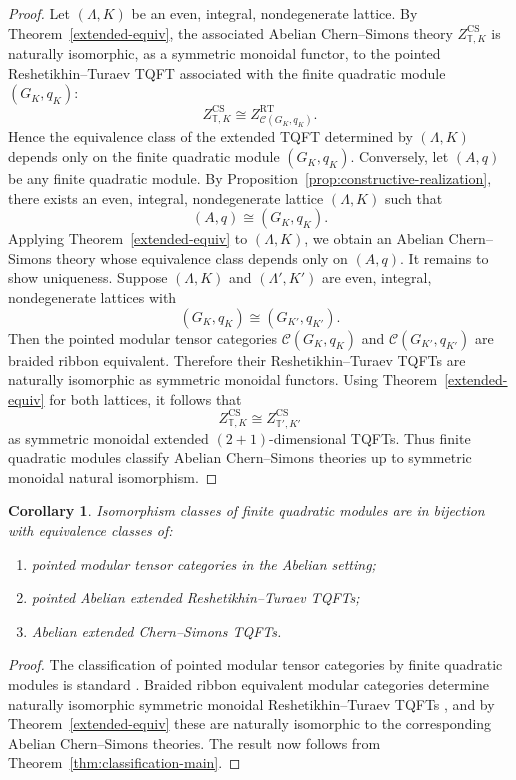 \documentclass[12pt]{amsart}
\numberwithin{equation}{section}
\newtheorem{corollary}[theorem]{Corollary}
\begin{document}
\begin{proof}
Let $(\Lambda,K)$ be an even, integral, nondegenerate lattice. By Theorem~\ref{extended-equiv}, the associated Abelian Chern--Simons theory $Z^{\mathrm{CS}}_{\mathbb T,K}$
is naturally isomorphic, as a symmetric monoidal functor, to the pointed Reshetikhin--Turaev TQFT associated with the finite quadratic module $(G_K,q_K)$:
\[
Z^{\mathrm{CS}}_{\mathbb T,K}
\cong
Z^{\mathrm{RT}}_{\mathcal C(G_K,q_K)}.
\]
Hence the equivalence class of the extended TQFT determined by $(\Lambda,K)$ depends only on the finite quadratic module $(G_K,q_K)$. Conversely, let $(A,q)$ be any finite quadratic module. By Proposition~\ref{prop:constructive-realization}, there exists an even, integral, nondegenerate lattice $(\Lambda,K)$ such that
\[
(A,q)\cong (G_K,q_K).
\]
Applying Theorem~\ref{extended-equiv} to $(\Lambda,K)$, we obtain an Abelian Chern--Simons theory whose equivalence class depends only on $(A,q)$. It remains to show uniqueness. Suppose $(\Lambda,K)$ and $(\Lambda',K')$ are even, integral, nondegenerate lattices with
\[
(G_K,q_K)\cong (G_{K'},q_{K'}).
\]
Then the pointed modular tensor categories $\mathcal C(G_K,q_K)$ and $\mathcal C(G_{K'},q_{K'})$ are braided ribbon equivalent. Therefore their Reshetikhin--Turaev TQFTs are naturally isomorphic as symmetric monoidal functors. Using Theorem~\ref{extended-equiv} for both lattices, it follows that
\[
Z^{\mathrm{CS}}_{\mathbb T,K}
\cong
Z^{\mathrm{CS}}_{\mathbb T',K'}
\]
as symmetric monoidal extended $(2+1)$-dimensional TQFTs. Thus finite quadratic modules classify Abelian Chern--Simons theories up to symmetric monoidal natural isomorphism.
\end{proof}

\begin{corollary}
\label{cor:equivalent-classifications}
Isomorphism classes of finite quadratic modules are in bijection with equivalence classes of:
\begin{enumerate}
\item[\textup{(i)}] pointed modular tensor categories in the  Abelian setting;
\item[\textup{(ii)}] pointed Abelian extended  Reshetikhin--Turaev TQFTs;
\item[\textup{(iii)}] Abelian extended Chern--Simons TQFTs.
\end{enumerate}
\end{corollary}

\begin{proof}
The classification of pointed modular tensor categories by finite quadratic modules is standard \cite{Joyal-Street, DGNO2010}. Braided ribbon equivalent modular categories determine naturally isomorphic symmetric monoidal Reshetikhin--Turaev TQFTs \cite{Reshetikhin:1991,Turaev1994}, and by Theorem~\ref{extended-equiv} these are naturally isomorphic to the corresponding Abelian Chern--Simons theories. The result now follows from Theorem~\ref{thm:classification-main}.
\end{proof}
\end{document}
